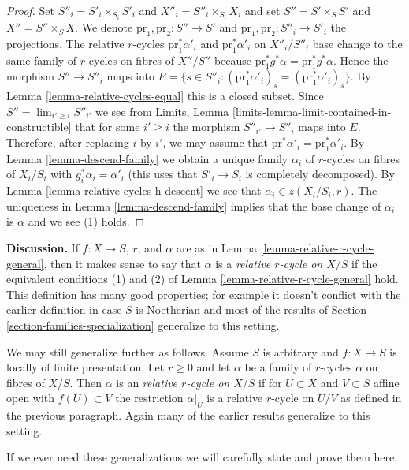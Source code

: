 \documentclass{stacks-project}
\theoremstyle{plain}
\theoremstyle{definition}
\theoremstyle{remark}
\numberwithin{equation}{subsection}
\def\lim{\mathop{\mathrm{lim}}\nolimits}
\begin{document}
\begin{proof}
\medskip\noindent
Set $S''_i = S'_i \times_{S_i} S'_i$ and $X''_i = S''_i \times_{S_i} X_i$
and set $S'' = S' \times_S S'$ and $X'' = S'' \times_S X$.
We denote $\text{pr}_1, \text{pr}_2 : S'' \to S'$ and
$\text{pr}_1, \text{pr}_2 : S''_i \to S'_i$ the projections.
The relative $r$-cycles $\text{pr}_1^*\alpha'_i$ and $\text{pr}_1^*\alpha'_i$
on $X''_i/S''_i$ base change to the same family of $r$-cycles
on fibres of $X''/S''$ because
$\text{pr}_1^*g^*\alpha = \text{pr}_1^*g^*\alpha$.
Hence the morphism $S'' \to S''_i$ maps into $E =
\{s \in S''_i : (\text{pr}_1^*\alpha'_i)_s = (\text{pr}_1^*\alpha'_i)_s\}$.
By Lemma \ref{lemma-relative-cycles-equal} this is a closed subset.
Since $S'' = \lim_{i' \geq i} S''_{i'}$ we see from
Limits, Lemma
\ref{limits-lemma-limit-contained-in-constructible}
that for some $i' \geq i$ the morphism $S''_{i'} \to S''_i$
maps into $E$. Therefore, after replacing $i$ by $i'$, we may assume that
$\text{pr}_1^*\alpha'_i = \text{pr}_1^*\alpha'_i$.
By Lemma \ref{lemma-descend-family}
we obtain a unique family $\alpha_i$
of $r$-cycles on fibres of $X_i/S_i$
with $g_i^*\alpha_i = \alpha'_i$ (this uses that $S'_i \to S_i$
is completely decomposed).
By Lemma \ref{lemma-relative-cycles-h-descent}
we see that $\alpha_i \in z(X_i/S_i, r)$.
The uniqueness in Lemma \ref{lemma-descend-family} implies that the
base change of $\alpha_i$ is $\alpha$ and we see (1) holds.
\end{proof}

\noindent
{\bf Discussion.}
If $f : X \to S$, $r$, and $\alpha$ are as in
Lemma \ref{lemma-relative-r-cycle-general}, then it makes sense to
say that $\alpha$ is a {\it relative $r$-cycle on $X/S$} if
the equivalent conditions
(1) and (2) of Lemma \ref{lemma-relative-r-cycle-general} hold.
This definition has many good properties; for example it
doesn't conflict with the earlier definition in case $S$
is Noetherian and most of the results of
Section \ref{section-families-specialization} generalize
to this setting.

\medskip\noindent
We may still generalize further as follows.
Assume $S$ is arbitrary and $f : X \to S$ is locally of finite presentation.
Let $r \geq 0$ and let $\alpha$ be a family of $r$-cycles $\alpha$ on fibres of
$X/S$. Then $\alpha$ is an {\it relative $r$-cycle on $X/S$} if
for $U \subset X$ and $V \subset S$ affine open with $f(U) \subset V$
the restriction $\alpha|_U$ is a relative $r$-cycle on $U/V$ as
defined in the previous paragraph. Again many of the earlier results
generalize to this setting.

\medskip\noindent
If we ever need these generalizations we will carefully state and prove
them here.























\end{document}
